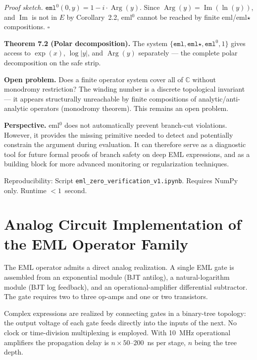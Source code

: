 \documentclass[11pt,a4paper]{article}
\begin{document}
\textit{Proof sketch.} $\texttt{eml}^0(0, y) = 1 - i \cdot \operatorname{Arg}(y)$. Since $\operatorname{Arg}(y) = \operatorname{Im}(\ln(y))$, and $\operatorname{Im}$ is not in $E$ by Corollary~2.2, eml$^0$ cannot be reached by finite eml/eml$\star$ compositions. $\square$

\textbf{Theorem 7.2 (Polar decomposition).} The system $\{\texttt{eml}, \texttt{eml}\star, \texttt{eml}^0, 1\}$ gives access to $\exp(x)$, $\log|y|$, and $\operatorname{Arg}(y)$ separately --- the complete polar decomposition on the safe strip.

\textbf{Open problem.} Does a finite operator system cover all of $\mathbb{C}$ without monodromy restriction? The winding number is a discrete topological invariant --- it appears structurally unreachable by finite compositions of analytic/anti-analytic operators (monodromy theorem). This remains an open problem.

\textbf{Perspective.} eml$^0$ does not automatically prevent branch-cut violations. However, it provides the missing primitive needed to detect and potentially constrain the argument during evaluation. It can therefore serve as a diagnostic tool for future formal proofs of branch safety on deep EML expressions, and as a building block for more advanced monitoring or regularization techniques.

Reproducibility: Script \texttt{eml\_zero\_verification\_v1.ipynb}. Requires NumPy only. Runtime $< 1$~second.

\section{Analog Circuit Implementation of the EML Operator Family}

The EML operator admits a direct analog realization. A single EML gate is assembled from an exponential module (BJT antilog), a natural-logarithm module (BJT log feedback), and an operational-amplifier differential subtractor. The gate requires two to three op-amps and one or two transistors.

Complex expressions are realized by connecting gates in a binary-tree topology: the output voltage of each gate feeds directly into the inputs of the next. No clock or time-division multiplexing is employed. With 10~MHz operational amplifiers the propagation delay is $n \times 50$--$200$~ns per stage, $n$ being the tree depth.
\end{document}
